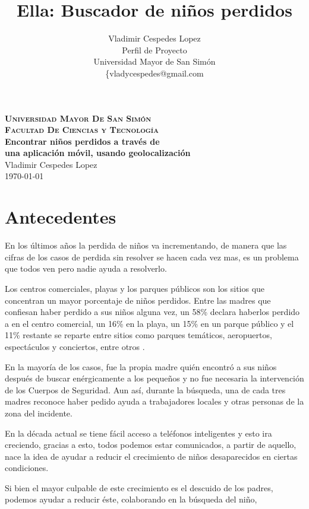 \documentclass[letter,11pt,oneside,spanish]{article}
\title{\textbf{Ella: Buscador de niños perdidos}}
\author{Vladimir Cespedes Lopez\\
Perfil de Proyecto\\
Universidad Mayor de San Simón\\
\{vladycespedes@gmail.com\\}
\date{}
\begin{document}
\begin{titlepage}
\thispagestyle{empty}
\begin{center}
\large{\textsc{\bf Universidad Mayor De San Simón}}\\
\large{\textsc{\bf Facultad De Ciencias y Tecnología}}\\
\vspace{4.0cm}
\large{\bf Encontrar niños perdidos a través de \\
una aplicación móvil, usando geolocalización}\\
\vspace{1.0cm}
\small{Vladimir Cespedes Lopez}
~\\
\small{\today}
\end{center}
\end{titlepage}

\newpage
\tableofcontents

\newpage
\section{Antecedentes}
En los últimos años la perdida de niños va incrementando, de manera que las cifras de los 
casos de perdida sin resolver se hacen cada vez mas, es un problema que todos ven pero 
nadie ayuda a resolverlo.

Los centros comerciales, playas y los parques públicos son los sitios que 
concentran un mayor porcentaje de niños perdidos. Entre las madres que confiesan 
haber perdido a sus niños alguna vez, un 58\% declara haberlos perdido a en el 
centro comercial, un 16\% en la playa, un 15\% en un parque público y el 11\% 
restante se reparte entre sitios como parques temáticos, aeropuertos, 
espectáculos y conciertos, entre otros \cite{Delphi1}.

En la mayoría de los casos, fue la propia madre quién encontró a sus niños 
después de buscar enérgicamente a los pequeños y no fue necesaria la 
intervención de los Cuerpos de Seguridad. Aun así, durante la búsqueda, 
una de cada tres madres reconoce haber pedido ayuda a trabajadores locales 
y otras personas de la zona del incidente.

En la década actual se tiene fácil acceso a teléfonos inteligentes y esto ira creciendo,
 gracias a esto, todos podemos estar comunicados, a partir de aquello, nace la idea de 
 ayudar a reducir el crecimiento de niños desaparecidos en ciertas condiciones.
 
Si bien el mayor culpable de este crecimiento es el descuido de los padres, podemos 
ayudar a reducir éste, colaborando en la búsqueda del niño, 
\end{document}
